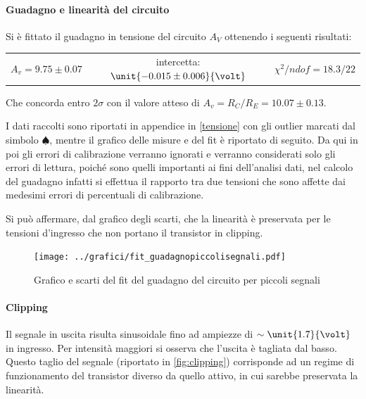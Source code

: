 \documentclass[10pt,a4paper]{article}
\begin{document}
\paragraph{Guadagno e linearità del circuito}
Si è fittato il guadagno in tensione del circuito $A_V$ ottenendo i seguenti risultati:
\begin{table}[h!]
	\centering
	\begin{tabular}{ccc}
		$A_v = 9.75 \pm 0.07$ & intercetta: $\unit{-0.015 \pm 0.006}{\volt}$ & $\chi^2 / ndof = 18.3 / 22$
	\end{tabular}
\end{table}
 
 Che concorda entro $2\sigma$ con il valore atteso di $A_v = R_C/R_E = 10.07\pm0.13$.
 
 I dati raccolti sono riportati in appendice in \tablename{\ref{tensione}} con gli outlier marcati dal simbolo $\spadesuit$, mentre il grafico delle misure e del fit è riportato di seguito. 
 Da qui in poi gli errori di calibrazione verranno ignorati e verranno considerati solo gli errori di lettura, poiché sono quelli importanti ai fini dell'analisi dati, nel calcolo del guadagno infatti si effettua il rapporto tra due tensioni che sono affette dai medesimi errori di percentuali di calibrazione.
 
 Si può affermare, dal grafico degli scarti, che la linearità è preservata per le tensioni d'ingresso che non portano il transistor in clipping.

\begin{figure}[h!]
\centering
\texttt{[image: ../grafici/fit\_guadagnopiccolisegnali.pdf]}
\caption{Grafico e scarti del fit del guadagno del circuito per piccoli segnali}
\end{figure}

\paragraph{Clipping}
Il segnale in uscita risulta sinusoidale fino ad ampiezze di $\sim \unit{1.7}{\volt}$ in ingresso.
Per intensità maggiori si osserva che l'uscita è tagliata dal basso. Questo taglio del segnale (riportato in \figurename{\ref{fig:clipping}}) corrisponde ad un regime di funzionamento del transistor diverso da quello attivo, in cui sarebbe preservata la linearità.
\end{document}
